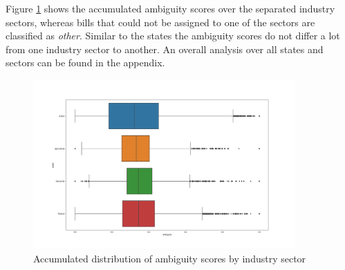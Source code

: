 \documentclass{custom_report}
\begin{document}
Figure \ref{fig:uss_ambiguity_by_sector} shows the accumulated ambiguity scores over the separated industry sectors, whereas bills that could not be assigned to one of the sectors are classified as \textit{other}. Similar to the states the ambiguity scores do not differ a lot from one industry sector to another. An overall analysis over all states and sectors can be found in the appendix. 

\begin{figure}[h!]
\begin{center}
\includegraphics[width=10cm]{images/uss_ambiguity_by_sector.png}
\end{center}
\caption{Accumulated distribution of ambiguity scores by industry sector}
\label{fig:uss_ambiguity_by_sector}
\end{figure}

\end{document}
